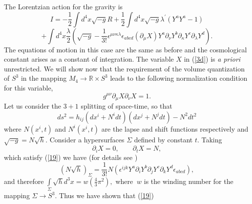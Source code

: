 \documentclass
[twocolumn,prl,unsortedaddress,superscriptaddress,showpacs]{revtex4}%
\begin{document}
The Lorentzian action for the gravity is%
\begin{equation}
I=-\frac{1}{2}%
{\displaystyle\int}
d^{4}x\sqrt{-g}R+\frac{1}{2}%
{\displaystyle\int}
d^{4}x\sqrt{-g}\lambda^{\prime}\left(  Y^{a}Y^{a}-1\right) \nonumber
\end{equation}%
\begin{equation}
+%
{\displaystyle\int}
d^{4}x\frac{\lambda}{2}\left(  \sqrt{-g}-\frac{1}{3!}\epsilon^{\mu\nu
\kappa\lambda}\epsilon_{abcd}\left(  \partial_{\mu}X\right)  Y^{a}%
\partial_{\nu}Y^{b}\partial_{\kappa}Y^{c}\partial_{\lambda}Y^{d}\right)  .
\label{3d}%
\end{equation}
The equations of motion in this case are the same as before and the
cosmological constant arises as a constant of integration. The variable $X$ in
(\ref{3d}) is \emph{a priori} unrestricted. We will show now that the
requirement of the volume quantization of $S^{3}$ in the mapping
$M_{4}\rightarrow\mathbb{R\times}S^{3}$ leads to the following normalization
condition for this variable,
\begin{equation}
g^{\mu\nu}\partial_{\mu}X\partial_{\nu}X=1. \label{19}%
\end{equation}
Let us consider the $3+1$ splitting of space-time, so that
\begin{equation}
ds^{2}=h_{ij}\left(  dx^{i}+N^{i}dt\right)  \left(  dx^{j}+N^{j}dt\right)
-N^{2}dt^{2} \label{20}%
\end{equation}
where $N\left(  x^{i},t\right)  $ and $N^{i}\left(  x^{i},t\right)  $ are the
lapse and shift functions respectively and $\sqrt{-g}=N\sqrt{h}.$ Consider a
hypersurfaces $\Sigma$ defined by constant $t.$ Taking
\begin{equation}
\partial_{i}X=0,\qquad\partial_{t}X=N, \label{22}%
\end{equation}
which satisfy (\ref{19}) we have (for details see \cite{CCM2})
\begin{equation}
\left(  N\sqrt{h}\right)  _{\Sigma}=\frac{1}{3!}N\left(  \epsilon^{ijk}%
Y^{a}\partial_{i}Y^{b}\partial_{j}Y^{c}\partial_{k}Y^{d}\epsilon
_{abcd}\right)  , \label{23}%
\end{equation}
and therefore $%
{\displaystyle\int\limits_{\Sigma}}
\sqrt{h}d^{3}x=w(\frac{4}{3}\pi^{2}),$ where $\ w$ is the winding number for
the mapping $\Sigma\rightarrow S^{3}.$ Thus we have shown that (\ref{19})
\end{document}

